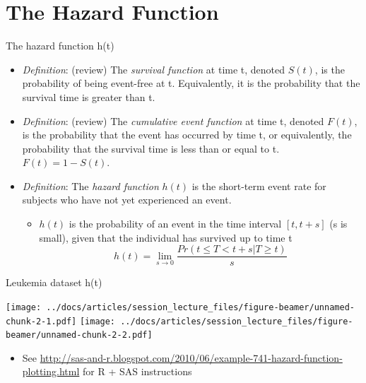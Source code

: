 \documentclass[
  ignorenonframetext,
]{beamer}
\providecommand{\tightlist}{%
  \setlength{\itemsep}{0pt}\setlength{\parskip}{0pt}}
\begin{document}
\hypertarget{the-hazard-function}{%
\section{The Hazard Function}\label{the-hazard-function}}

\begin{frame}{The hazard function h(t)}
\protect\hypertarget{the-hazard-function-ht}{}

\begin{itemize}
\item
  \emph{Definition}: (review) The \emph{survival function} at time t,
  denoted \(S(t)\), is the probability of being event-free at t.
  Equivalently, it is the probability that the survival time is greater
  than t.
\item
  \emph{Definition}: (review) The \emph{cumulative event function} at
  time t, denoted \(F(t)\), is the probability that the event has
  occurred by time t, or equivalently, the probability that the survival
  time is less than or equal to t. \(F(t) = 1-S(t)\).
\item
  \emph{Definition}: The \emph{hazard function} \(h(t)\) is the
  short-term event rate for subjects who have not yet experienced an
  event.

  \begin{itemize}
  \tightlist
  \item
    \(h(t)\) is the probability of an event in the time interval
    \([t, t+s]\) (s is small), given that the individual has survived up
    to time t
    \[h(t) = \lim_{s \to 0} \frac{Pr(t \leq T < t+s | T \ge t)}{s}\]
  \end{itemize}
\end{itemize}

\end{frame}

\begin{frame}{Leukemia dataset h(t)}
\protect\hypertarget{leukemia-dataset-ht}{}

\texttt{[image: ../docs/articles/session\_lecture\_files/figure-beamer/unnamed-chunk-2-1.pdf]}
\texttt{[image: ../docs/articles/session\_lecture\_files/figure-beamer/unnamed-chunk-2-2.pdf]}

\footnotesize

\begin{itemize}
\tightlist
\item
  See
  \url{http://sas-and-r.blogspot.com/2010/06/example-741-hazard-function-plotting.html}
  for R + SAS instructions
\end{itemize}

\end{frame}
\end{document}
